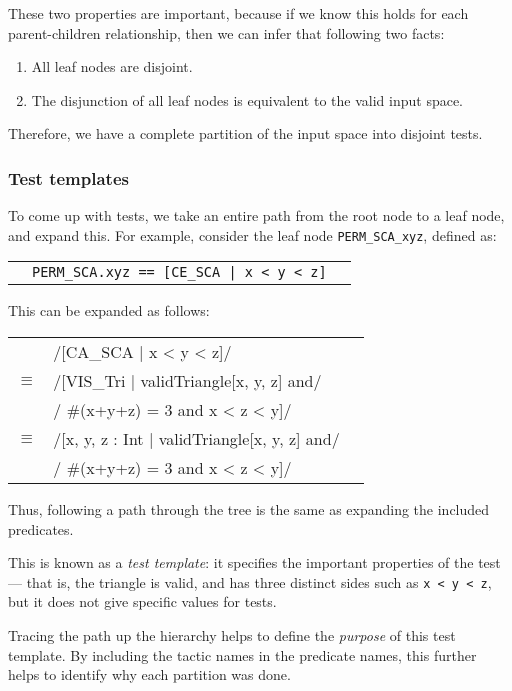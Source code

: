 These two properties are important, because if we know this holds for each parent-children relationship, then we can infer that following two facts:

\begin{enumerate}

 \item All leaf nodes are disjoint.

 \item The disjunction of all leaf nodes is equivalent to the valid input space.

\end{enumerate}

Therefore, we have a complete partition of the input space into disjoint tests.

\subsubsection*{Test templates}

To come up with tests, we take an entire path from the root node to a leaf node, and expand this.  For example, consider the leaf node \texttt{PERM\_SCA\_xyz}, defined as:

\begin{tabular}{lll}
         & \verb+PERM_SCA.xyz == [CE_SCA | x < y < z]+
\end{tabular}

This can be expanded as follows:

\begin{tabular}{lll}
         & \A/[CA_SCA | x < y < z]/\\[2mm]
$\equiv$ & \A/[VIS_Tri | validTriangle[x, y, z] and/\\
         & \A/            #(x+y+z) = 3 and x < z < y]/\\[2mm]
$\equiv$ & \A/[x, y, z : Int | validTriangle[x, y, z] and/\\
         & \A/            #(x+y+z) = 3 and x < z < y]/
\end{tabular}

Thus, following a path through the tree is the same as expanding the included predicates.

This is known as a \emph{test template}: it specifies the important properties of the test --- that is, the triangle is valid, and has three distinct sides such as \verb+x < y < z+, but it does not give specific values for tests. 

Tracing the path up the hierarchy helps to define the \emph{purpose} of this test template. By including the tactic names in the predicate names, this further helps to identify why each partition was done.

